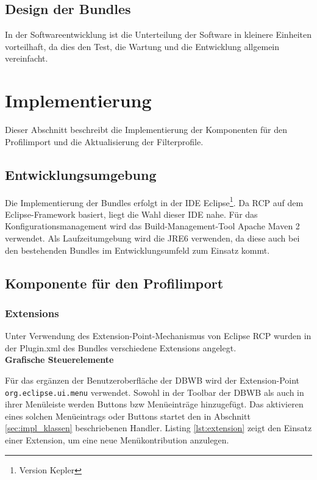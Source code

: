 {\subsection{Design der Bundles}{
In der Softwareentwicklung ist die Unterteilung der Software in kleinere Einheiten vorteilhaft, da dies den Test, die Wartung und die Entwicklung allgemein vereinfacht.




}

\section{Implementierung}{
\label{sec:implementierung}
Dieser Abschnitt beschreibt die Implementierung der Komponenten für den Profilimport und die Aktualisierung der Filterprofile.

\subsection{Entwicklungsumgebung}{
Die Implementierung der Bundles erfolgt in der \ac{IDE} Eclipse\footnote{Version Kepler}. Da \ac{RCP} auf dem Eclipse-Framework basiert, liegt die Wahl dieser \ac{IDE} nahe. Für das Konfigurationsmanagement wird das Build-Management-Tool Apache Maven 2 verwendet. Als Laufzeitumgebung wird die \ac{JRE}6 verwenden, da diese auch bei den bestehenden Bundles im Entwicklungsumfeld zum Einsatz kommt.
}




\subsection{Komponente für den Profilimport}{
\label{sec:impl_import}

\subsubsection{Extensions}{
Unter Verwendung des Extension-Point-Mechanismus von Eclipse \ac{RCP} wurden in der Plugin.xml des Bundles verschiedene Extensions angelegt.\\

\textbf{Grafische Steuerelemente}{

Für das ergänzen der Benutzeroberfläche der \ac {DBWB} wird der Extension-Point 
\texttt{org.eclipse.ui.menu} verwendet. Sowohl in der Toolbar der \ac{DBWB} als auch in ihrer Menüleiste werden Buttons bzw Menüeinträge hinzugefügt. Das aktivieren eines solchen Menüeintrags oder Buttons startet den in Abschnitt \ref{sec:impl_klassen} beschriebenen Handler. Listing \ref{lst:extension} zeigt den Einsatz einer Extension, um eine neue Menükontribution anzulegen.

}}}}}
